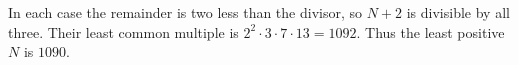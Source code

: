 In each case the remainder is two less than the divisor, so $N+2$ is divisible by all three. Their least common multiple is $2^2\cdot3\cdot7\cdot13=1092$. Thus the least positive $N$ is $\boxed{1090}$.
